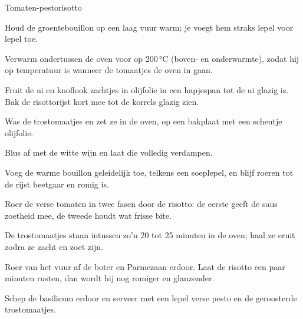 \begin{recipe}{Tomaten-pestorisotto}
\begin{steps}
  \item Houd de groentebouillon op een laag vuur warm; je voegt hem straks lepel
        voor lepel toe.
  \item Verwarm ondertussen de oven voor op 200\,°C (boven- en onderwarmte), zodat 
        hij op temperatuur is wanneer de tomaatjes de oven in gaan.
  \item Fruit de ui en knoflook zachtjes in olijfolie in een hapjespan tot de ui
        glazig is. Bak de risottorijst kort mee tot de korrels glazig zien.
  \item Was de trostomaatjes en zet ze in de oven, op een bakplaat met een scheutje olijfolie.
  \item Blus af met de witte wijn en laat die volledig verdampen.
  \item Voeg de warme bouillon geleidelijk toe, telkens een soeplepel, en blijf
        roeren tot de rijst beetgaar en romig is.
  \item Roer de verse tomaten in twee fasen door de risotto: de eerste geeft de
        saus zoetheid mee, de tweede houdt wat frisse bite.
  \item De trostomaatjes staan intussen zo'n 20 tot 25 minuten in de oven;
        haal ze eruit zodra ze zacht en zoet zijn.
  \item Roer van het vuur af de boter en Parmezaan erdoor. Laat de risotto een
        paar minuten rusten, dan wordt hij nog romiger en glanzender.
  \item Schep de basilicum erdoor en serveer met een lepel verse pesto en de
        geroosterde trostomaatjes.
\end{steps}


\end{recipe}
